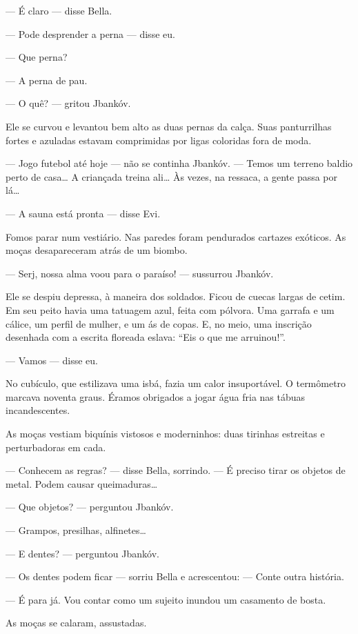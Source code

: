 --- É claro --- disse Bella.

--- Pode desprender a perna --- disse eu.

--- Que perna?

--- A perna de pau.

--- O quê? --- gritou Jbankóv.

Ele se curvou e levantou bem alto as duas pernas da calça. Suas
panturrilhas fortes e azuladas estavam comprimidas por ligas coloridas
fora de moda.

--- Jogo futebol até hoje --- não se continha Jbankóv.
--- Temos um terreno baldio perto de casa\ldots{} A criançada treina
ali\ldots{} Às vezes, na ressaca, a gente passa por lá\ldots{}

--- A sauna está pronta --- disse Evi.

Fomos parar num vestiário. Nas paredes foram pendurados cartazes
exóticos. As moças desapareceram atrás de um biombo.

--- Serj, nossa alma voou para o paraíso! --- sussurrou
Jbankóv.

Ele se despiu depressa, à maneira dos soldados. Ficou de cuecas largas
de cetim. Em seu peito havia uma tatuagem azul, feita com pólvora. Uma
garrafa e um cálice, um perfil de mulher, e um ás de copas. E, no meio,
uma inscrição desenhada com a escrita floreada eslava: ``Eis o que me
arruinou!''.

--- Vamos --- disse eu.

No cubículo, que estilizava uma isbá, fazia um calor insuportável. O
termômetro marcava noventa graus. Éramos obrigados a jogar água fria nas
tábuas incandescentes.

As moças vestiam biquínis vistosos e moderninhos: duas tirinhas
estreitas e perturbadoras em cada.

--- Conhecem as regras? --- disse Bella, sorrindo.
--- É preciso tirar os objetos de metal. Podem causar
queimaduras\ldots{}

--- Que objetos? --- perguntou Jbankóv.

--- Grampos, presilhas, alfinetes\ldots{}

--- E dentes? --- perguntou Jbankóv.

--- Os dentes podem ficar --- sorriu Bella e acrescentou:
--- Conte outra história.

--- É para já. Vou contar como um sujeito inundou um casamento de
bosta.

As moças se calaram, assustadas.

